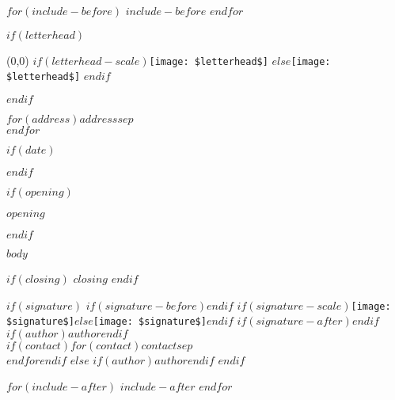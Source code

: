 \documentclass[$if(font-size)$$fontsize$$else$11pt$endif$]{letter}
\begin{document}
$for(include-before)$
$include-before$
$endfor$

$if(letterhead)$
\begin{textblock}{0}(0,0)
$if(letterhead-scale)$\texttt{[image: \$letterhead\$]}
$else$\texttt{[image: \$letterhead\$]}
$endif$
\end{textblock}
$endif$

\begin{letter}{$for(address)$$address$$sep$\\$endfor$}

$if(date)$\date{$date$}$endif$

$if(opening)$\opening{$opening$}$endif$

$body$

$if(closing)$
$closing$
$endif$

$if(signature)$
$if(signature-before)$\vspace*{$signature-before$}$endif$
$if(signature-scale)$\texttt{[image: \$signature\$]}$else$\texttt{[image: \$signature\$]}$endif$
$if(signature-after)$\vspace*{$signature-after$}$endif$
$if(author)$$author$$endif$\\
$if(contact)$$for(contact)$$contact$$sep$\\$endfor$$endif$
$else$
$if(author)$$author$$endif$
$endif$

\end{letter}

$for(include-after)$
$include-after$
$endfor$
\end{document}
